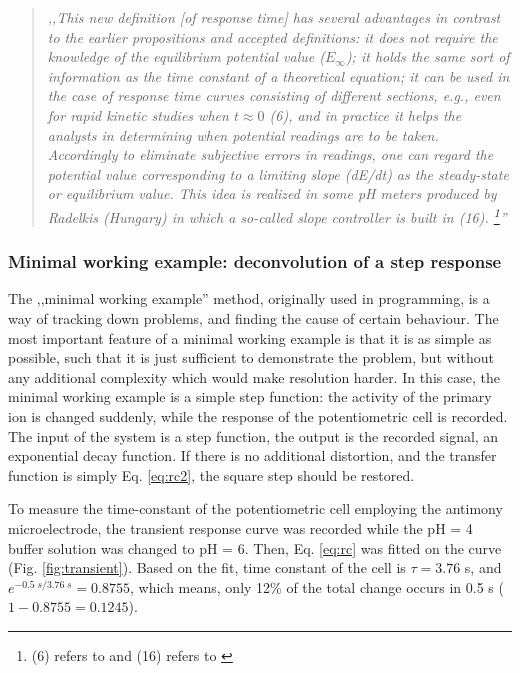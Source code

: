 \begin{quote}
\vspace{0.5cm}
\emph{,,This new definition [of response time] has several advantages in contrast to the earlier propositions and accepted definitions: it does not require the knowledge of the equilibrium potential value ($E_{\infty}$); it holds the same sort of information as the time constant of a theoretical equation; it can be used in the case of response time curves consisting of different sections, e.g., even for rapid kinetic studies when $t \approx 0$ (6), and in practice it helps the analysts in determining when potential readings are to be taken.
Accordingly to eliminate subjective errors in readings, one can regard the potential value corresponding to a limiting slope (dE/dt) as the steady-state or equilibrium value.
This idea is realized in some pH meters produced by Radelkis (Hungary) in which a so-called slope controller is built in (16).
\footnote{(6) refers to \cite{lindner1982response} and (16) refers to \cite{havas1981}}''}
\vspace{0.5cm}
\end{quote}


			\subsubsection{Minimal working example: deconvolution of a step response}
The ,,minimal working example'' method, originally used in programming, is a way of tracking down problems, and finding the cause of certain behaviour.
The most important feature of a minimal working example is that it is as simple as possible, such that it is just sufficient to demonstrate the problem, but without any additional complexity which would make resolution harder.
In this case, the minimal working example is a simple step function: the activity of the primary ion is changed suddenly, while the response of the potentiometric cell is recorded.
The input of the system is a step function, the output is the recorded signal, an exponential decay function.
If there is no additional distortion, and the transfer function is simply Eq. \ref{eq:rc2}, the square step should be restored. 

To measure the time-constant of the potentiometric cell employing the antimony microelectrode, the transient response curve was recorded while the pH = 4 buffer solution was changed to pH = 6.
Then, Eq. \ref{eq:rc} was fitted on the curve (Fig. \ref{fig:transient}).
Based on the fit, time constant of the cell is $\tau = 3.76$ s, and $e^{-0.5 \; s/3.76 \; s} = 0.8755$, which means, only 12\% of the total change occurs in 0.5 s ($1 - 0.8755 = 0.1245$). 

